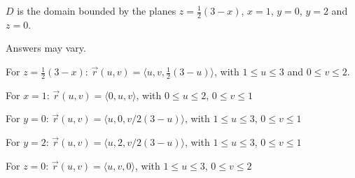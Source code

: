 {$D$ is the domain bounded by the planes $z = \frac12(3-x)$, $x=1$, $y=0$, $y=2$ and $z=0$.

{\hfill{}\hfill}
}
{Answers may vary.

For $z = \frac12(3-x)$: $\vec r(u,v) = \langle u, v , \frac12(3-u)\rangle$, with $1\leq u\leq 3$ and $0\leq v\leq 2$.

For $x=1$: $\vec r(u,v) = \langle 0,u,v\rangle$, with $0\leq u\leq 2$, $0\leq v\leq 1$

For $y=0$: $\vec r(u,v) = \langle u,0,v/2(3-u)\rangle$, with $1\leq u\leq 3$, $0\leq v\leq 1$

For $y=2$: $\vec r(u,v) = \langle u,2,v/2(3-u)\rangle$, with $1\leq u\leq 3$, $0\leq v\leq 1$

For $z=0$: $\vec r(u,v) = \langle u,v,0\rangle$, with $1\leq u\leq 3$, $0\leq v\leq 2$
}
